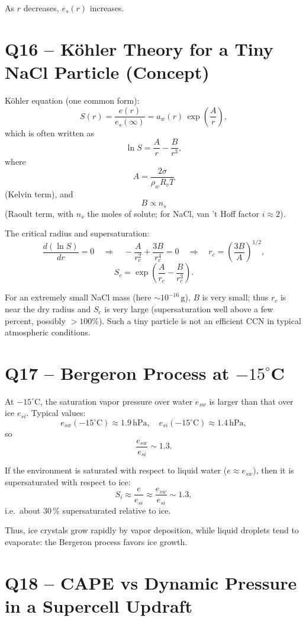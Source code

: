 \documentclass[12pt,a4paper]{article}
\begin{document}
As \(r\) decreases, \(e_s(r)\) increases.

\section*{Q16 -- Köhler Theory for a Tiny NaCl Particle (Concept)}

Köhler equation (one common form):
\[
S(r) = \frac{e(r)}{e_s(\infty)}
= a_w(r)\,\exp\left(\frac{A}{r}\right),
\]
which is often written as
\[
\ln S = \frac{A}{r} - \frac{B}{r^3},
\]
where
\[
A = \frac{2\sigma}{\rho_w R_v T}
\]
(Kelvin term), and
\[
B \propto n_s
\]
(Raoult term, with \(n_s\) the moles of solute; for NaCl,
van 't Hoff factor \(i \approx 2\)).

The critical radius and supersaturation:
\[
\frac{d(\ln S)}{dr} = 0
\quad\Rightarrow\quad
-\frac{A}{r_c^2}
+ \frac{3B}{r_c^4} = 0
\quad\Rightarrow\quad
r_c = \left(\frac{3B}{A}\right)^{1/2},
\]
\[
S_c = \exp\left(\frac{A}{r_c} - \frac{B}{r_c^3}\right).
\]

For an extremely small NaCl mass (here
\(\sim 10^{-16}\,\si{\gram}\)), \(B\) is very small;
thus \(r_c\) is near the dry radius and
\(S_c\) is very large (supersaturation well above a few percent,
possibly $>100\%$). Such a tiny particle is not an efficient CCN
in typical atmospheric conditions.

\section*{Q17 -- Bergeron Process at \texorpdfstring{$-15^\circ$C}{-15°C}}

At \(-15^\circ\text{C}\), the saturation vapor pressure over water
\(e_{sw}\) is larger than that over ice \(e_{si}\). Typical values:
\[
e_{sw}(-15^\circ\text{C}) \approx 1.9 \,\si{\hecto\pascal},\quad
e_{si}(-15^\circ\text{C}) \approx 1.4 \,\si{\hecto\pascal},
\]
so
\[
\frac{e_{sw}}{e_{si}} \sim 1.3.
\]

If the environment is saturated with respect to liquid water
(\(e \approx e_{sw}\)), then it is supersaturated with respect to ice:
\[
S_i \approx \frac{e}{e_{si}}
\approx \frac{e_{sw}}{e_{si}}
\sim 1.3,
\]
i.e.\ about 30\,\% supersaturated relative to ice.

Thus, ice crystals grow rapidly by vapor deposition, while liquid
droplets tend to evaporate: the Bergeron process favors ice growth.

\section*{Q18 -- CAPE vs Dynamic Pressure in a Supercell Updraft}
\end{document}
